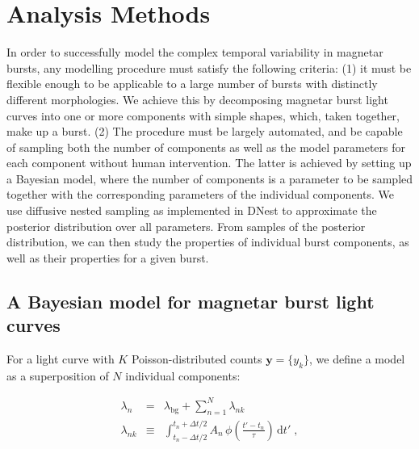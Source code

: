 \documentclass[12pt]{emulateapj}
\newcommand{\given}{\,|\,}
\newcommand{\dd}{\mathrm{d}}
\newcommand{\counts}{y}
\newcommand{\pars}{\theta}
\newcommand{\mean}{\lambda}
\newcommand{\Poisson}{{\mathcal P}}
\newcommand{\bg}{\mathrm{bg}}
\newcommand{\word}{\phi}
\begin{document}
\section{Analysis Methods}
\label{sec:methods}
In order to successfully model the complex temporal variability in magnetar bursts, any modelling procedure must satisfy the following criteria: (1) it must be flexible enough to be applicable to a large number of bursts with distinctly different morphologies. We achieve this by decomposing magnetar burst light curves into one or more components with simple shapes, which, taken together, make up a burst. (2) The procedure must be largely automated, and be capable of sampling both the number of components as well as the model parameters for each component without human intervention. The latter is achieved by setting up a Bayesian model, where the number of components is a parameter to be sampled together with the corresponding parameters of the individual components. We use diffusive nested sampling as implemented in DNest \citep{brewer2011} to approximate the posterior distribution over all parameters. From samples of the posterior distribution,
we can then study the properties of individual burst components, as well as their properties for a given burst.

\subsection{A Bayesian model for magnetar burst light curves}
\label{sec:model}

For a light curve with $K$ Poisson-distributed counts $\bm{\counts} = \{\counts_k\}$, we define a model as a superposition of $N$ individual components:

\begin{eqnarray}
\mean_n &=& \mean_{\bg} + \sum_{n=1}^N \mean_{nk}
\\
\mean_{nk} &\equiv& \int_{t_n-\Delta t/2}^{t_n+\Delta t/2} A_n\,\word(\frac{t'-t_n}{\tau})\,\dd t' \; ,
\end{eqnarray}
\end{document}
